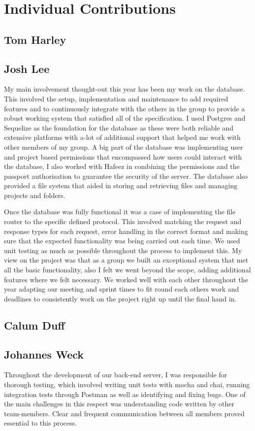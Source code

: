 \section{Individual Contributions}
\subsection{Tom Harley}
\subsection{Josh Lee}
My main involvement thought-out this year has been my work on the database. This involved the setup, implementation and maintenance to add required features and to continuously integrate with the others in the group to provide a robust working system that satisfied all of the specification. I used Postgres and Sequelize as the foundation for the database as these were both reliable and extensive platforms with a-lot of additional support that helped me work with other members of my group. A big part of the database was implementing user and project based permissions that encompassed how users could interact with the database, I also worked with Hafeez in combining the permissions and the passport authorisation to guarantee the security of the server. The database also provided a file system that aided in storing and retrieving files and managing projects and folders. 

Once the database was fully functional it was a case of implementing the file router to the specific defined protocol. This involved matching the request and response types for each request, error handling in the correct format and making sure that the expected functionality was being carried out each time. We used unit testing as much as possible throughout the process to implement this. My view on the project was that as a group we built an exceptional system that met all the basic functionality, also I felt we went beyond the scope, adding additional features where we felt necessary. We worked well with each other throughout the year adapting our meeting and sprint times to fit round each others work and deadlines to consistently work on the project right up until the final hand in.
\subsection{Calum Duff}
\subsection{Johannes Weck}
Throughout the development of our back-end server, I was responsible for thorough testing, which involved writing unit tests with mocha and chai, running integration tests through Postman as well as identifying and fixing bugs. One of the main challenges in this respect was understanding code written by other team-members. Clear and frequent communication between all members proved essential to this process.

